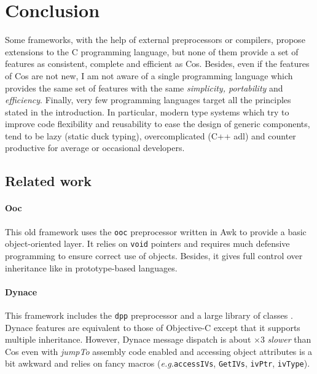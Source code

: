 \documentclass[preprint,10pt]{sigplanconf}
\newcommand{\abbrev}[1]{{\em #1}\xspace}
\newcommand{\eg}{\abbrev{e.g.}}
\newcommand{\ProgLang}[1]{{\sc #1}\xspace}
\newcommand{\Awk}       {\ProgLang{Awk}}
\newcommand{\Cos}       {\ProgLang{Cos}}
\newcommand{\Objc}      {\ProgLang{Objective-C}}
\newcommand{\code}[1]{\lstinline[language=COS,style=samplecode]|#1|}
\begin{document}
\section{Conclusion\label{sec:end}}


Some frameworks, with the help of external preprocessors or compilers, propose extensions to the C programming language, but none of them provide a set of features as consistent, complete and efficient as \Cos. Besides, even if the features of \Cos are not new, I am not aware of a single programming language which provides the same set of features with the same {\em simplicity, portability} and {\em efficiency}. Finally, very few programming languages target all the principles stated in the introduction. In particular, modern type systems which try to improve code flexibility and reusability to ease the design of generic components, tend to be lazy (static duck typing), overcomplicated (C++ {\sc adl}) and counter productive for average or occasional developers.

\subsection{Related work}

\paragraph{Ooc}

This old framework uses the \code{ooc} preprocessor written in \Awk \cite{ooc94} to provide a basic object-oriented layer. It relies on \code{void} pointers and requires much defensive programming to ensure correct use of objects. Besides, it gives full control over inheritance 
like in prototype-based languages.


\paragraph{Dynace}

This framework includes the \code{dpp} preprocessor and a large library of classes \cite{dyn06}. Dynace features are equivalent to those of \Objc except that it supports multiple inheritance. However, Dynace message dispatch is about $\times 3$ {\em slower} than \Cos even with {\em jumpTo} assembly code enabled and accessing object attributes is a bit awkward and relies on fancy macros (\eg \code{accessIVs}, \code{GetIVs}, \code{ivPtr}, \code{ivType}).
\end{document}
